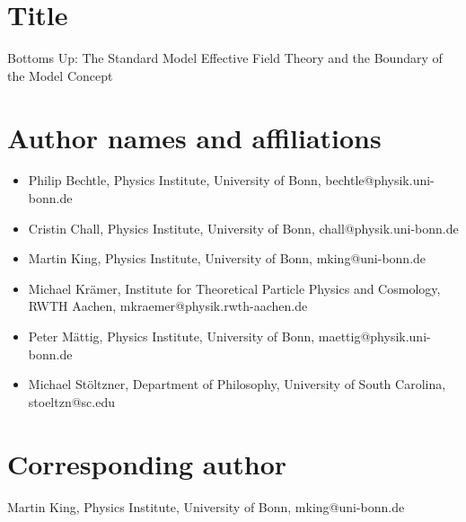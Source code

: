 \documentclass{article}
\begin{document}
\section*{Title}
Bottoms Up: The Standard Model Effective Field Theory and the Boundary of the Model Concept

\section*{Author names and affiliations}
\begin{itemize}
	\item Philip Bechtle, Physics Institute, University of Bonn, bechtle@physik.uni-bonn.de
	\item Cristin Chall, Physics Institute, University of Bonn, chall@physik.uni-bonn.de
	\item Martin King, Physics Institute, University of Bonn, mking@uni-bonn.de
	\item Michael Kr\"{a}mer, Institute for Theoretical Particle Physics and Cosmology, RWTH Aachen, mkraemer@physik.rwth-aachen.de
	\item Peter M\"{a}ttig, Physics Institute, University of Bonn, maettig@physik.uni-bonn.de
	\item Michael St\"{o}ltzner, Department of Philosophy, University of South Carolina, stoeltzn@sc.edu
\end{itemize}

\section*{Corresponding author}
Martin King, Physics Institute, University of Bonn, mking@uni-bonn.de
\end{document}
